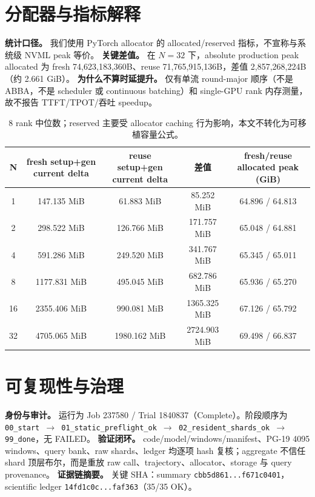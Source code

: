\documentclass[11pt]{article}
\begin{document}
\section{分配器与指标解释}
\textbf{统计口径。} 我们使用 PyTorch allocator 的 allocated/reserved 指标，不宣称与系统级 NVML peak 等价。  
\textbf{关键差值。} 在 $N=32$ 下，absolute production peak allocated 为 fresh 74,623,183,360B、reuse 71,765,915,136B，差值 2,857,268,224B（约 2.661 GiB）。  
\textbf{为什么不算时延提升。} 仅有单流 round-major 顺序（不是 ABBA，不是 scheduler 或 continuous batching）和 single-GPU rank 内存测量，故不报告 TTFT/TPOT/吞吐 speedup。

\begin{table}[h]
\centering
\begin{tabular}{ccccc}
\toprule
N & fresh setup+gen current delta & reuse setup+gen current delta & 差值 & fresh/reuse allocated peak (GiB)\\
\midrule
1 & 147.135 MiB & 61.883 MiB & 85.252 MiB & 64.896 / 64.813\\
2 & 298.522 MiB & 126.766 MiB & 171.757 MiB & 65.048 / 64.881\\
4 & 591.286 MiB & 249.520 MiB & 341.767 MiB & 65.345 / 65.011\\
8 & 1177.831 MiB & 495.045 MiB & 682.786 MiB & 65.936 / 65.270\\
16 & 2355.406 MiB & 990.081 MiB & 1365.325 MiB & 67.126 / 65.792\\
32 & 4705.065 MiB & 1980.162 MiB & 2724.903 MiB & 69.498 / 66.837\\
\bottomrule
\end{tabular}
\caption{8 rank 中位数；reserved 主要受 allocator caching 行为影响，本文不转化为可移植容量公式。}
\end{table}

\section{可复现性与治理}
\textbf{身份与审计。} 运行为 Job 237580 / Trial 1840837（Complete）。阶段顺序为
\texttt{00\_start $\rightarrow$ 01\_static\_preflight\_ok $\rightarrow$ 02\_resident\_shards\_ok $\rightarrow$ 99\_done}，无 FAILED。  
\textbf{验证闭环。} code/model/windows/manifest、PG-19 4095 windows、query bank、raw shards、ledger 均逐项 hash 复核；aggregate 不信任 shard 顶层布尔，而是重放 raw call、trajectory、allocator、storage 与 query provenance。  
\textbf{证据链摘要。} 关键 SHA：summary \texttt{cbb5d861...f671c0401}，scientific ledger \texttt{14fd1c0c...faf363}（35/35 OK）。
\end{document}
